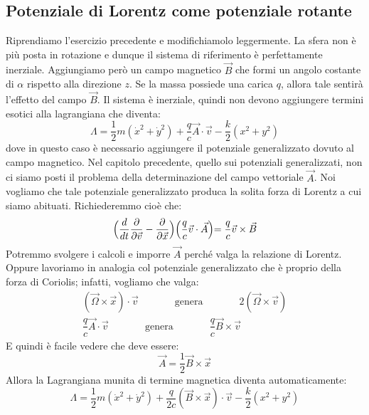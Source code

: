 \documentclass[a4paper,openany]{article}
\begin{document}
	\subsection{Potenziale di Lorentz come potenziale rotante}
	Riprendiamo l'esercizio precedente e modifichiamolo leggermente. La sfera non è più posta in rotazione e dunque il sistema di riferimento è perfettamente inerziale. Aggiungiamo però un campo magnetico $\vec{B}$ che formi un angolo costante di $\alpha$ rispetto alla direzione $z$. Se la massa possiede una carica $q$, allora tale sentirà l'effetto del campo $\vec{B}$. Il sistema è inerziale, quindi non devono aggiungere termini esotici alla lagrangiana che diventa:
	\begin{equation}
		\Lambda = \dfrac{1}{2}m(\dot{x}^{2}+\dot{y}^{2}) +\dfrac{q}{c}\vec{A}\cdot\vec{v} - \dfrac{k}{2}(x^2+y^2) 
	\end{equation}
	dove in questo caso è necessario aggiungere il potenziale generalizzato dovuto al campo magnetico. Nel capitolo precedente, quello sui potenziali generalizzati, non ci siamo posti il problema della determinazione del campo vettoriale $\vec{A}$. Noi vogliamo che tale potenziale generalizzato produca la solita forza di Lorentz a cui siamo abituati. Richiederemmo cioè che:
	$$
	\Bigl(\dfrac{d}{dt}\dfrac{\partial}{\partial \vec{v}} - \dfrac{\partial}{\partial \vec{x}}\Bigl)\Bigl(\dfrac{q}{c}\vec{v}\cdot\vec{A}\Bigl) = \dfrac{q}{c}\vec{v}\times\vec{B}
	$$
	Potremmo svolgere i calcoli e imporre $\vec{A}$ perché valga la relazione di Lorentz. Oppure lavoriamo in analogia col potenziale generalizzato che è proprio della forza di Coriolis; infatti, vogliamo che valga:
	\begin{equation}
		\begin{aligned}
			(\vec{\Omega}\times\vec{x})\cdot\vec{v} \>\>\>\>\>\>\>\>\>\>\>\>\>\>\> \mbox{             genera             }\>\>\>\>\>\>\>\>\>\>\>\>\>\>\> 2(\vec{\Omega}\times\vec{v})
			\\
			\dfrac{q}{c}\vec{A}\cdot\vec{v}\>\>\>\>\>\>\>\>\>\>\>\>\>\>\> \mbox{             genera             }\>\>\>\>\>\>\>\>\>\>\>\>\>\>\> \dfrac{q}{c}\vec{B}\times\vec{v}
		\end{aligned}
	\end{equation}
	E quindi è facile vedere che deve essere:
	\begin{equation}
		\vec{A} = \dfrac{1}{2}\vec{B}\times\vec{x}
		\label{A}
	\end{equation}
	Allora la Lagrangiana munita di termine magnetica diventa automaticamente:
	\begin{equation}
		\Lambda = \dfrac{1}{2}m(\dot{x}^{2}+\dot{y}^{2}) +\dfrac{q}{2c}(\vec{B}\times\vec{x})\cdot\vec{v} - \dfrac{k}{2}(x^2+y^2) 
	\end{equation}
\end{document}
